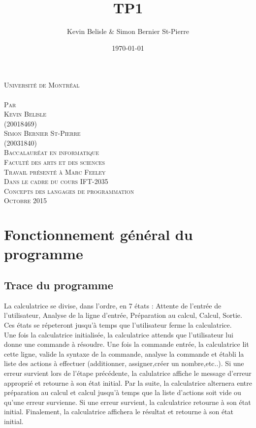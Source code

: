 \documentclass[a4paper,12pt,french]{article}
\date{\today}
\author{Kevin Belisle \& Simon Bernier St-Pierre}
\title{TP1}
\newcommand{\Teacher}{Marc Feeley}
\newcommand{\ClassNum}{IFT-2035}
\newcommand{\ClassName}{Concepts des langages de programmation}
\newcommand{\DateMMMMYYYY}{Octobre 2015}
\newcommand{\Author}{Kevin Belisle}
\newcommand{\Authorr}{Simon Bernier St-Pierre}
\begin{document}
\begin{titlepage}
	\begin{center}
		\textsc{\normalsize Université de Montréal}\\[2.5cm]

		\textsc{\LARGE \@title}\\[2.5cm]

		\textsc{\small Par}\\[0.25cm]
		\textsc{\LARGE \Author}\\[0.25cm]
		\textsc{\normalsize (20018469)}\\[0.25cm]
		\textsc{\LARGE \Authorr}\\[0.25cm]
		\textsc{\normalsize (20031840)}\\[2.5cm]

		\textsc{\normalsize Baccalauréat en informatique}\\
		\textsc{\normalsize Faculté des arts et des sciences}\\[2.5cm]

		\textsc{\small Travail présenté à \Teacher}\\
		\textsc{\small Dans le cadre du cours \ClassNum}\\
		\textsc{\small \ClassName}\\[2.5cm]

		\textsc{\normalsize \DateMMMMYYYY}\\[1.5cm]
	\end{center}
\end{titlepage}
\section{Fonctionnement général du programme}
	\subsection{Trace du programme}
	La calculatrice se divise, dans l'ordre, en 7 états : Attente de l'entrée de l'utilisateur, Analyse de la ligne d'entrée, Préparation au calcul, Calcul, Sortie. Ces états se répeteront jusqu'à temps que l'utilisateur ferme la calculatrice.\\

	Une fois la calculatrice initialisée, la calculatrice attends que l'utilisateur lui donne une commande à résoudre. Une fois la commande entrée, la calculatrice lit cette ligne, valide la syntaxe de la commande, analyse la commande et établi la liste des actions à effectuer (additionner, assigner,créer un nombre,etc..). Si une erreur survient lors de l'étape précédente, la calulatrice affiche le message d'erreur approprié et retourne à son état initial. Par la suite, la calculatrice alternera entre préparation au calcul et calcul jusqu'à temps que la liste d'actions soit vide ou qu'une erreur survienne. Si une erreur survient, la calculatrice retourne à son état initial. Finalement, la calculatrice affichera le résultat et retourne à son état initial.
\end{document}
